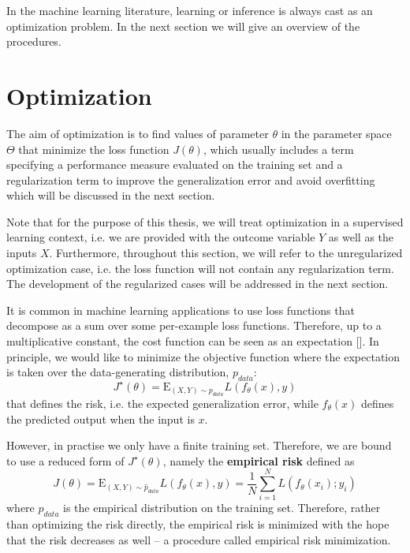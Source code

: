 In the machine learning literature, learning or inference is always cast as an optimization problem. In the next section we will give an overview of the procedures.



\section{Optimization}\label{sec:optimization}
The aim of optimization is to find values of parameter $\theta$ in the parameter space $\Theta$ that minimize the loss function $J(\theta)$, which usually includes a term specifying a performance measure evaluated on the training set and a regularization term to improve the generalization error and avoid overfitting which will be discussed in the next section.

Note that for the purpose of this thesis, we will treat optimization in a supervised learning context, i.e. we are provided with the outcome variable $Y$ as well as the inputs $X$. Furthermore, throughout this section, we will refer to the unregularized optimization case, i.e. the loss function will not contain any regularization term. The development of the regularized cases will be addressed in the next section.

It is common in machine learning applications to use loss functions that decompose as a sum over some per-example loss functions. Therefore, up to a multiplicative constant, the cost function can be seen as an expectation [\cite{Goodfellow-et-al-2016}]. In principle, we would like to minimize the objective function where the expectation is taken over the data-generating distribution, $p_{data}$:
\begin{equation}
    J^\star(\theta) = \mathrm{E}_{(X, Y) \sim p_{data}} L\left( f_\theta(x), y \right) \label{risk}
\end{equation}
that defines the risk, i.e. the expected generalization error, while $f_\theta(x)$ defines the predicted output when the input is $x$.

However, in practise we only have a finite training set. Therefore, we are bound to use a reduced form of $J^\star(\theta)$, namely the \textbf{empirical risk} defined as
\begin{equation}
    J(\theta) = \mathrm{E}_{(X, Y) \sim \hat{p}_{data}} L\left( f_\theta(x), y \right) = \frac{1}{N} \sum_{i=1}^{N} L\left( f_\theta(x_i) ; y_i \right) \label{empirical_risk}
\end{equation}
where $\hat{p}_{data}$ is the empirical distribution on the training set. Therefore, rather than optimizing the risk directly, the empirical risk is minimized with the hope that the risk decreases as well -- a procedure called empirical risk minimization. 

